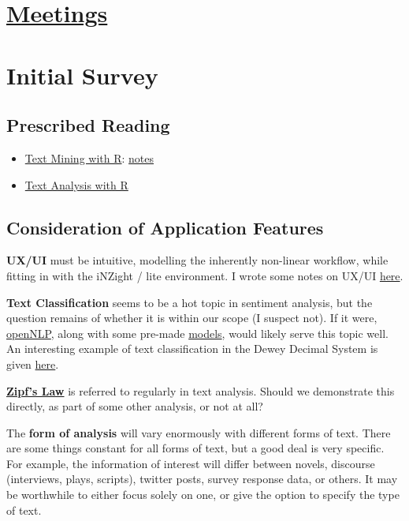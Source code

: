 \documentclass[11pt]{article}
\date{\today}
\title{}
\begin{document}
\tableofcontents

\section{\href{meeting\_notes.org}{Meetings}}
\label{sec:orgb48adf5}

\section{Initial Survey}
\label{sec:orga3c451c}
\subsection{Prescribed Reading}
\label{sec:orgfe7562a}
\begin{itemize}
\item \href{https://www.tidytextmining.com}{Text Mining with R}: \href{./text\_mining\_with\_r.org}{notes}
\item \href{https://m-clark.github.io/text-analysis-with-R/}{Text Analysis with R}
\end{itemize}

\subsection{Consideration of Application Features}
\label{sec:org28a2ffa}

\textbf{UX/UI} must be intuitive, modelling the inherently non-linear workflow,
while fitting in with the iNZight / lite environment. I wrote some notes
on UX/UI \href{./ux\_ui.org}{here}.

\textbf{Text Classification} seems to be a hot topic in sentiment analysis, but
the question remains of whether it is within our scope (I suspect not).
If it were, \href{https://cran.r-project.org/web/packages/openNLP/}{openNLP}, along with some pre-made \href{https://datacube.wu.ac.at/src/contrib/}{models}, would likely serve 
this topic well. An interesting example of text classification in the
Dewey Decimal System is given \href{http://creatingdata.us/models/SRP-classifiers}{here}.

\textbf{\href{../reading/Thurner2015\%20-\%20Understanding\%20Zipfs\%20Law\%20of\%20Word\%20Frequencies\%20through\%20Sample\%20Space\%20Collapse\%20in\%20Sentence\%20Formation.pdf}{Zipf's Law}} is referred to regularly in text analysis. Should we demonstrate
this directly, as part of some other analysis, or not at all?

The \textbf{form of analysis} will vary enormously with different forms of
text. There are some things constant for all forms of text, but a good
deal is very specific. For example, the information of interest will
differ between novels, discourse (interviews, plays, scripts), twitter
posts, survey response data, or others. It may be worthwhile to either
focus solely on one, or give the option to specify the type of text.
\end{document}
